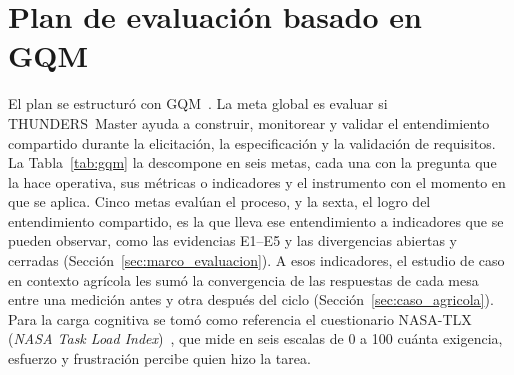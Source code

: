 \documentclass[12pt,letterpaper,oneside]{report}
\begin{document}
\section{Plan de evaluación basado en GQM}
\label{sec:plan_gqm}
El plan se estructuró con GQM~\cite{basili1994gqm}. La meta global es evaluar
si THUNDERS~Master ayuda a construir, monitorear y validar el entendimiento
compartido durante la elicitación, la especificación y la validación de
requisitos. La Tabla~\ref{tab:gqm} la descompone en seis metas, cada una con la
pregunta que la hace operativa, sus métricas o indicadores y el instrumento con
el momento en que se aplica. Cinco metas evalúan el proceso, y la sexta, el
logro del entendimiento compartido, es la que lleva ese entendimiento a
indicadores que se pueden observar, como las evidencias E1--E5 y las
divergencias abiertas y cerradas (Sección~\ref{sec:marco_evaluacion}). A esos
indicadores, el estudio de caso en contexto agrícola les sumó la convergencia de
las respuestas de cada mesa entre una medición antes y otra después del ciclo
(Sección~\ref{sec:caso_agricola}). Para la carga cognitiva se tomó como
referencia el cuestionario NASA-TLX (\textit{NASA Task Load
Index})~\cite{hart1988nasa}, que mide en seis escalas de 0 a 100 cuánta
exigencia, esfuerzo y frustración percibe quien hizo la tarea.
\end{document}
